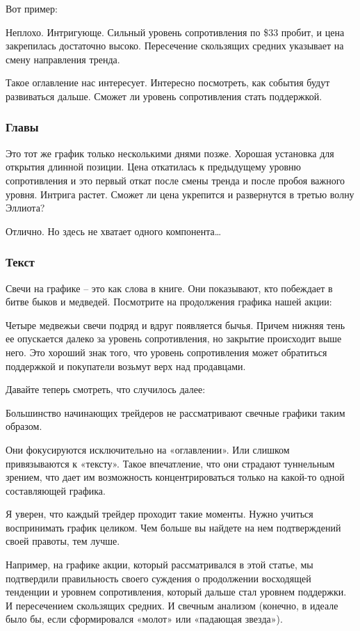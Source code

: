 \documentclass{book}
\begin{document}
Вот пример:

Неплохо. Интригующе. Сильный уровень сопротивления по \$33 пробит, и цена закрепилась достаточно высоко. Пересечение скользящих средних указывает на смену направления тренда.

Такое оглавление нас интересует. Интересно посмотреть, как события будут развиваться дальше. Сможет ли уровень сопротивления стать поддержкой.

\subsubsection{Главы}

Это тот же график только несколькими днями позже. Хорошая установка для открытия длинной позиции. Цена откатилась к предыдущему уровню сопротивления и это первый откат после смены тренда и после пробоя важного уровня. Интрига растет. Сможет ли цена укрепится и развернутся в третью волну Эллиота?

Отлично. Но здесь не хватает одного компонента…

\subsubsection{Текст}

Свечи на графике – это как слова в книге. Они показывают, кто побеждает в битве быков и медведей. Посмотрите на продолжения графика нашей акции:

Четыре медвежьи свечи подряд и вдруг появляется бычья. Причем нижняя тень ее опускается далеко за уровень сопротивления, но закрытие происходит выше него. Это хороший знак того, что уровень сопротивления может обратиться поддержкой и покупатели возьмут верх над продавцами.

Давайте теперь смотреть, что случилось далее:

Большинство начинающих трейдеров не рассматривают свечные графики таким образом.

Они фокусируются исключительно на «оглавлении». Или слишком привязываются к «тексту». Такое впечатление, что они страдают туннельным зрением, что дает им возможность концентрироваться только на какой-то одной составляющей графика.

Я уверен, что каждый трейдер проходит такие моменты. Нужно учиться воспринимать график целиком. Чем больше вы найдете на нем подтверждений своей правоты, тем лучше.

Например, на графике акции, который рассматривался в этой статье, мы подтвердили правильность своего суждения о продолжении восходящей тенденции и уровнем сопротивления, который дальше стал уровнем поддержки. И пересечением скользящих средних. И свечным анализом (конечно, в идеале было бы, если сформировался «молот» или «падающая звезда»).
\end{document}
